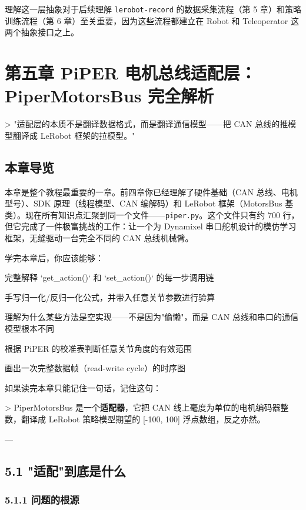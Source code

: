 \documentclass[UTF8,a4paper,11pt]{ctexart}
\begin{document}
理解这一层抽象对于后续理解 \texttt{lerobot-record} 的数据采集流程（第 5 章）和策略训练流程（第 6 章）至关重要，因为这些流程都建立在 Robot 和 Teleoperator 这两个抽象接口之上。

\endgroup
\newpage

\begingroup
\section{第五章 PiPER 电机总线适配层：PiperMotorsBus 完全解析}

> "适配层的本质不是翻译数据格式，而是翻译通信模型——把 CAN 总线的推模型翻译成 LeRobot 框架的拉模型。"

\subsection{本章导览}

本章是整个教程最重要的一章。前四章你已经理解了硬件基础（CAN 总线、电机型号）、SDK 原理（线程模型、CAN 编解码）和 LeRobot 框架（MotorsBus 基类）。现在所有知识点汇聚到同一个文件——\texttt{piper.py}。这个文件只有约 700 行，但它完成了一件极富挑战的工作：让一个为 Dynamixel 串口舵机设计的模仿学习框架，无缝驱动一台完全不同的 CAN 总线机械臂。

学完本章后，你应该能够：

\item 完整解释 `get_action()` 和 `set_action()` 的每一步调用链
\item 手写归一化/反归一化公式，并带入任意关节参数进行验算
\item 理解为什么某些方法是空实现——不是因为"偷懒"，而是 CAN 总线和串口的通信模型根本不同
\item 根据 PiPER 的校准表判断任意关节角度的有效范围
\item 画出一次完整数据帧（read-write cycle）的时序图

如果读完本章只能记住一句话，记住这句：

> PiperMotorsBus 是一个\textbf{适配器}，它把 CAN 线上毫度为单位的电机编码器整数，翻译成 LeRobot 策略模型期望的 [-100, 100] 浮点数组，反之亦然。

---

\subsection{5.1 "适配"到底是什么}

\subsubsection{5.1.1 问题的根源}
\end{document}
